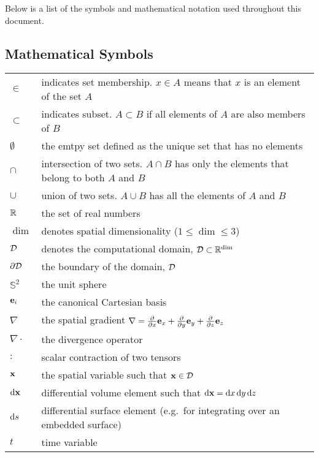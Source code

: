 \documentclass[../doc.tex]{subfiles}
\begin{document}
Below is a list of the symbols and mathematical notation used throughout this document. 

\subsection*{Mathematical Symbols}
\begin{longtable}{p{2cm}p{12cm}}
$\in$ & indicates set membership. $x \in A$ means that $x$ is an element of the set $A$\\
$\subset$ & indicates subset. $A \subset B$ if all elements of $A$ are also members of $B$ \\
$\emptyset$ & the emtpy set defined as the unique set that has no elements \\
$\cap$ & intersection of two sets. $A\cap B$ has only the elements that belong to both $A$ and $B$ \\
$\cup$ & union of two sets. $A\cup B$ has all the elements of $A$ and $B$ \\
$\mathbb{R}$ & the set of real numbers \\
$\dim$ & denotes spatial dimensionality ($1\leq \dim \leq 3$) \\
$\mathcal{D}$ & denotes the computational domain, $\mathcal{D} \subset \mathbb{R}^{\dim}$\\ 
$\partial\mathcal{D}$ & the boundary of the domain, $\mathcal{D}$ \\
$\mathbb{S}^2$ & the unit sphere \\
$\boldsymbol{\mathrm{e}}_i$ & the canonical Cartesian basis \\
$\nabla$ & the spatial gradient $\nabla = \frac{\partial }{\partial x} \boldsymbol{\mathrm{e}}_x + \frac{\partial }{\partial y}\boldsymbol{\mathrm{e}}_y + \frac{\partial }{\partial z}\boldsymbol{\mathrm{e}}_z$ \\
$\nabla\cdot$ & the divergence operator \\
$:$ & scalar contraction of two tensors \\
$\boldsymbol{\mathrm{x}}$ & the spatial variable such that $\boldsymbol{\mathrm{x}} \in \mathcal{D}$ \\
$\mathop{}\!\mathrm{d}\boldsymbol{\mathrm{x}}$ & differential volume element such that $\mathop{}\!\mathrm{d}\boldsymbol{\mathrm{x}} = \mathop{}\!\mathrm{d} x \mathop{}\!\mathrm{d} y \mathop{}\!\mathrm{d} z$ \\ 
$\mathop{}\!\mathrm{d} s$ & differential surface element (e.g.~for integrating over an embedded surface) \\
$t$ & time variable \\
\end{longtable}
\end{document}
